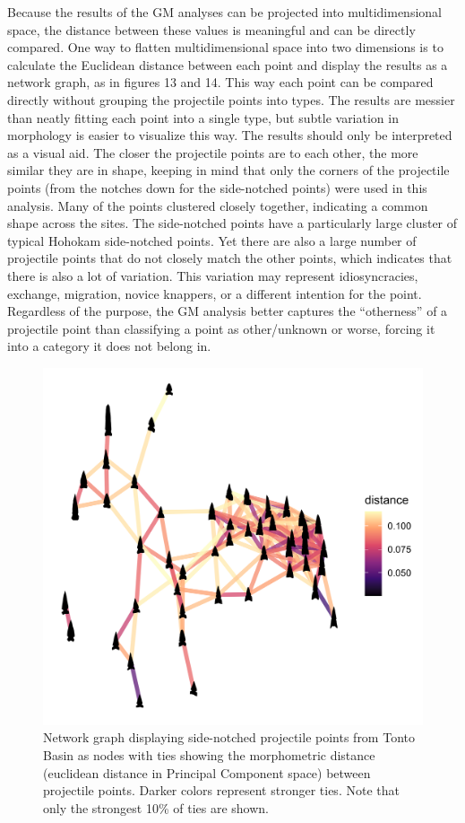 \documentclass[letterpaper]{article}
\begin{document}
Because the results of the GM analyses can be projected into multidimensional space, the distance between these values is meaningful and can be directly compared. One way to flatten multidimensional space into two dimensions is to calculate the Euclidean distance between each point and display the results as a network graph, as in figures 13 and 14. This way each point can be compared directly without grouping the projectile points into types. The results are messier than neatly fitting each point into a single type, but subtle variation in morphology is easier to visualize this way. The results should only be interpreted as a visual aid. The closer the projectile points are to each other, the more similar they are in shape, keeping in mind that only the corners of the projectile points (from the notches down for the side-notched points) were used in this analysis. Many of the points clustered closely together, indicating a common shape across the sites. The side-notched points have a particularly large cluster of typical Hohokam side-notched points. Yet there are also a large number of projectile points that do not closely match the other points, which indicates that there is also a lot of variation. This variation may represent idiosyncracies, exchange, migration, novice knappers, or a different intention for the point. Regardless of the purpose, the GM analysis better captures the ``otherness'' of a projectile point than classifying a point as other/unknown or worse, forcing it into a category it does not belong in.

\begin{figure}
\includegraphics[width=1\linewidth]{figures/TontoSideDistanceNetwork} \caption{Network graph displaying side-notched projectile points from Tonto Basin as nodes with ties showing the morphometric distance (euclidean distance in Principal Component space) between projectile points. Darker colors represent stronger ties. Note that only the strongest 10\% of ties are shown.}\label{fig:TontoSideDistanceNetwork}
\end{figure}
\end{document}
